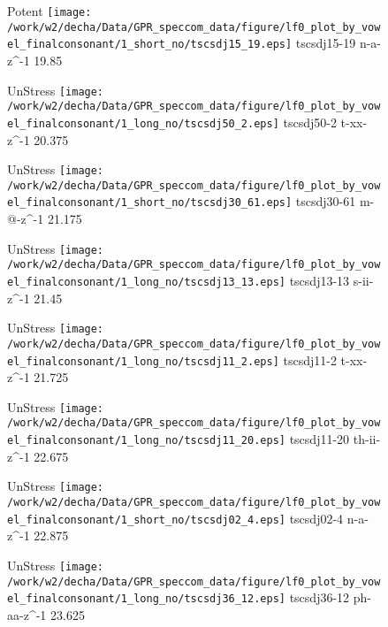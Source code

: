 \documentclass{article}
\begin{document}
\begin{figure}[t]
\begin{minipage}[b]{.24\textwidth}
\colorbox{Apricot}{Potent}
\centering
\texttt{[image: /work/w2/decha/Data/GPR\_speccom\_data/figure/lf0\_plot\_by\_vowel\_finalconsonant/1\_short\_no/tscsdj15\_19.eps]}
tscsdj15-19 n-a-z\textasciicircum-1 19.85
\end{minipage}
\begin{minipage}[b]{.24\textwidth}
UnStress
\centering
\texttt{[image: /work/w2/decha/Data/GPR\_speccom\_data/figure/lf0\_plot\_by\_vowel\_finalconsonant/1\_long\_no/tscsdj50\_2.eps]}
tscsdj50-2 t-xx-z\textasciicircum-1 20.375
\end{minipage}
\begin{minipage}[b]{.24\textwidth}
UnStress
\centering
\texttt{[image: /work/w2/decha/Data/GPR\_speccom\_data/figure/lf0\_plot\_by\_vowel\_finalconsonant/1\_short\_no/tscsdj30\_61.eps]}
tscsdj30-61 m-@-z\textasciicircum-1 21.175
\end{minipage}
\begin{minipage}[b]{.24\textwidth}
UnStress
\centering
\texttt{[image: /work/w2/decha/Data/GPR\_speccom\_data/figure/lf0\_plot\_by\_vowel\_finalconsonant/1\_long\_no/tscsdj13\_13.eps]}
tscsdj13-13 s-ii-z\textasciicircum-1 21.45
\end{minipage}
\end{figure}
\clearpage
\begin{figure}[t]
\begin{minipage}[b]{.24\textwidth}
UnStress
\centering
\texttt{[image: /work/w2/decha/Data/GPR\_speccom\_data/figure/lf0\_plot\_by\_vowel\_finalconsonant/1\_long\_no/tscsdj11\_2.eps]}
tscsdj11-2 t-xx-z\textasciicircum-1 21.725
\end{minipage}
\begin{minipage}[b]{.24\textwidth}
UnStress
\centering
\texttt{[image: /work/w2/decha/Data/GPR\_speccom\_data/figure/lf0\_plot\_by\_vowel\_finalconsonant/1\_long\_no/tscsdj11\_20.eps]}
tscsdj11-20 th-ii-z\textasciicircum-1 22.675
\end{minipage}
\begin{minipage}[b]{.24\textwidth}
UnStress
\centering
\texttt{[image: /work/w2/decha/Data/GPR\_speccom\_data/figure/lf0\_plot\_by\_vowel\_finalconsonant/1\_short\_no/tscsdj02\_4.eps]}
tscsdj02-4 n-a-z\textasciicircum-1 22.875
\end{minipage}
\begin{minipage}[b]{.24\textwidth}
UnStress
\centering
\texttt{[image: /work/w2/decha/Data/GPR\_speccom\_data/figure/lf0\_plot\_by\_vowel\_finalconsonant/1\_long\_no/tscsdj36\_12.eps]}
tscsdj36-12 ph-aa-z\textasciicircum-1 23.625
\end{minipage}
\end{figure}
\end{document}
